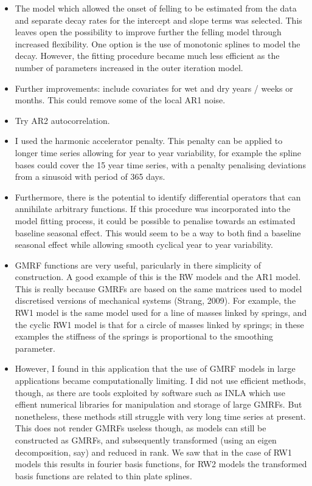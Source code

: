 \begin{itemize}
\item The model which allowed the onset of felling to be estimated from the data and separate decay rates for the intercept and slope terms was selected. This leaves open the possibility to improve further the felling model through increased flexibility. One option is the use of monotonic splines to model the decay.  However, the fitting procedure became much less efficient as the number of parameters increased in the outer iteration model. 

\item Further improvements: include covariates for wet and dry years / weeks or months.  This could remove some of the local AR1 noise.

\item Try AR2 autocorrelation.

\item I used the harmonic accelerator penalty.  This penalty can be applied to longer time series allowing for year to year variability, for example the spline bases could cover the 15 year time series, with a penalty penalising deviations from a sinusoid with period of 365 days.  

\item Furthermore, there is the potential to identify differential operators that can annihilate arbitrary functions.  If this procedure was incorporated into the model fitting process, it could be possible to penalise towards an estimated baseline seasonal effect.  This would seem to be a way to both find a baseline seasonal effect while allowing smooth cyclical year to year variability.

\item GMRF functions are very useful, paricularly in there simplicity of construction.  A good example of this is the RW models and the AR1 model. This is really because GMRFs are based on the same matrices used to model discretised versions of mechanical systems (Strang, 2009).  For example, the RW1 model is the same model used for a line of masses linked by springs, and the cyclic RW1 model is that for a circle of masses linked by springs; in these examples the stiffness of the springs is proportional to the smoothing parameter.  

\item However, I found in this application that the use of GMRF models in large applications became computationally limiting.  I did not use efficient methods, though, as there are tools exploited by software such as INLA which use effient numerical libraries for manipulation and storage of large GMRFs. But nonetheless, these methods still struggle with very long time series at present.  This does not render GMRFs useless though, as models can still be constructed as GMRFs, and subsequently transformed (using an eigen decomposition, say) and reduced in rank.  We saw that in the case of RW1 models this results in fourier basis functions, for RW2 models the transformed basis functions are related to thin plate splines.
\end{itemize}
